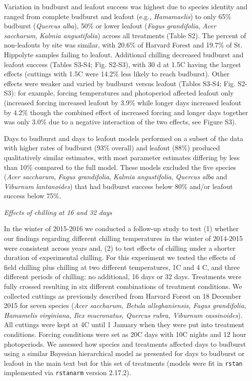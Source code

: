 \documentclass{article}
\begin{document}
\noindent Variation in budburst and leafout success was highest due to species identity and ranged from complete budburst and leafout (e.g., \emph{Hamamaelis}) to only 65\% budburst (\emph{Quercus alba}), 50\% or lower leafout (\emph{Fagus grandifolia}, \emph{Acer saccharum}, \emph{Kalmia angustifolia}) across all treatments (Table S2). The percent of non-leafouts by site was similar, with 20.6\% of Harvard Forest and 19.7\% of St. Hippolyte samples failing to leafout. Additional chilling decreased budburst and leafout success (Tables S3-S4; Fig. S2-S3), with 30 d at 1.5\degree C having the largest effects (cuttings with 1.5\degree C were 14.2\% less likely to reach budburst). Other effects were weaker and varied by budburst versus leafout (Tables S3-S4; Fig. S2-S3): for example, forcing temperatures and photoperiod affected leafout only (increased forcing increased leafout by 3.9\% while longer days increased leafout by 4.2\% though the combined effect of increased forcing and longer days together was only 3.0\% due to a negative interaction of the two effects, see Figure S3).

\noindent Days to budburst and days to leafout models performed on a subset of the data with higher rates of budburst (93\% overall) and leafout (88\%) produced qualitatively similar estimates, with most parameter estimates differing by less than 10\% compared to the full model. These models excluded the five species (\emph{Acer saccharum}, \emph{Fagus grandifolia}, \emph{Kalmia angustifolia}, \emph{Quercus alba} and \emph{Viburnum lantanoides}) that had budburst success below 80\% and/or leafout success below 75\%.

\noindent\emph{Effects of chilling at 16 and 32 days}

\noindent In the winter of 2015-2016 we conducted a follow-up study to test (1) whether our findings regarding different chilling temperatures in the winter of 2014-2015 were consistent across years and, (2) to test effects of chilling under a shorter duration of experimental chilling. For this experiment we tested the effects of field chilling plus chilling at two different temperatures, 1\degree C and 4 \degree C, and three different periods of chilling: no additional, 16 days or 32 days. Treatments were fully crossed resulting in six different combinations of treatment conditions. We collected cuttings as previously described from Harvard Forest on 18 December 2015 for seven species (\emph{Acer saccharum, Betula alleghaniensis, Fagus grandifolia, Hamamelis virginiana, Ilex mucronatus, Quercus rubra, Viburnum cassinoides}). All cuttings were kept at 4\degree C until 1 January when they were put into treatment conditions. Forcing conditions were set as 20\degree C days with 10\degree C nights and 12 hour photoperiods. We assessed how species and treatments affected days to budburst using a similar Bayesian hierarchical model as presented for days to budburst or leafout in the main text but for this set of treatments (models were fit in \verb|rstan| implemented via  \verb|rstanarm| version 2.17.2). 
\end{document}
